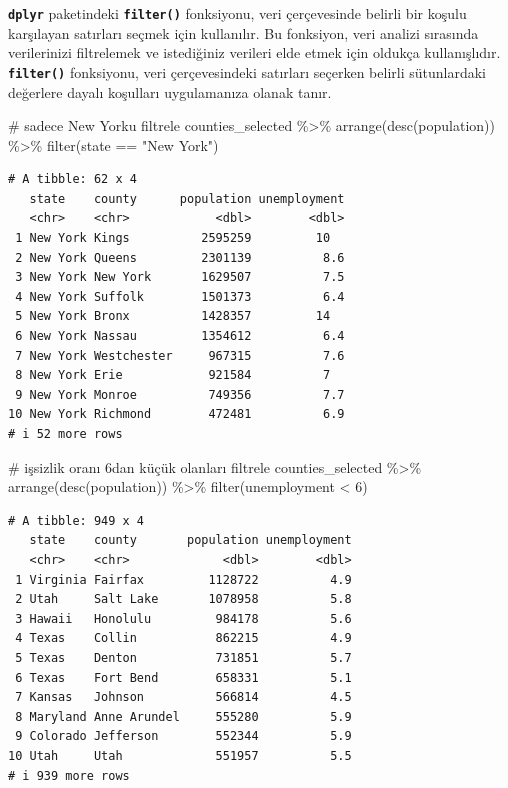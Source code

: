 \documentclass[
  letterpaper,
  DIV=11,
  numbers=noendperiod]{scrreprt}
\newenvironment{Shaded}{\begin{snugshade}}{\end{snugshade}}
\newcommand{\CommentTok}[1]{\textcolor[rgb]{0.37,0.37,0.37}{#1}}
\newcommand{\DecValTok}[1]{\textcolor[rgb]{0.68,0.00,0.00}{#1}}
\newcommand{\FunctionTok}[1]{\textcolor[rgb]{0.28,0.35,0.67}{#1}}
\newcommand{\NormalTok}[1]{\textcolor[rgb]{0.00,0.23,0.31}{#1}}
\newcommand{\SpecialCharTok}[1]{\textcolor[rgb]{0.37,0.37,0.37}{#1}}
\newcommand{\StringTok}[1]{\textcolor[rgb]{0.13,0.47,0.30}{#1}}
\begin{document}

\textbf{\texttt{dplyr}} paketindeki \textbf{\texttt{filter()}}
fonksiyonu, veri çerçevesinde belirli bir koşulu karşılayan satırları
seçmek için kullanılır. Bu fonksiyon, veri analizi sırasında
verilerinizi filtrelemek ve istediğiniz verileri elde etmek için oldukça
kullanışlıdır. \textbf{\texttt{filter()}} fonksiyonu, veri
çerçevesindeki satırları seçerken belirli sütunlardaki değerlere dayalı
koşulları uygulamanıza olanak tanır.

\begin{Shaded}
\begin{Highlighting}[]
\CommentTok{\# sadece New York\textquotesingle{}u filtrele}
\NormalTok{counties\_selected }\SpecialCharTok{\%\textgreater{}\%}
\FunctionTok{arrange}\NormalTok{(}\FunctionTok{desc}\NormalTok{(population)) }\SpecialCharTok{\%\textgreater{}\%}
\FunctionTok{filter}\NormalTok{(state }\SpecialCharTok{==} \StringTok{"New York"}\NormalTok{)}
\end{Highlighting}
\end{Shaded}

\begin{verbatim}
# A tibble: 62 x 4
   state    county      population unemployment
   <chr>    <chr>            <dbl>        <dbl>
 1 New York Kings          2595259         10  
 2 New York Queens         2301139          8.6
 3 New York New York       1629507          7.5
 4 New York Suffolk        1501373          6.4
 5 New York Bronx          1428357         14  
 6 New York Nassau         1354612          6.4
 7 New York Westchester     967315          7.6
 8 New York Erie            921584          7  
 9 New York Monroe          749356          7.7
10 New York Richmond        472481          6.9
# i 52 more rows
\end{verbatim}

\begin{Shaded}
\begin{Highlighting}[]
\CommentTok{\# işsizlik oranı 6\textquotesingle{}dan küçük olanları filtrele}
\NormalTok{counties\_selected }\SpecialCharTok{\%\textgreater{}\%}
\FunctionTok{arrange}\NormalTok{(}\FunctionTok{desc}\NormalTok{(population)) }\SpecialCharTok{\%\textgreater{}\%}
\FunctionTok{filter}\NormalTok{(unemployment }\SpecialCharTok{\textless{}} \DecValTok{6}\NormalTok{)}
\end{Highlighting}
\end{Shaded}

\begin{verbatim}
# A tibble: 949 x 4
   state    county       population unemployment
   <chr>    <chr>             <dbl>        <dbl>
 1 Virginia Fairfax         1128722          4.9
 2 Utah     Salt Lake       1078958          5.8
 3 Hawaii   Honolulu         984178          5.6
 4 Texas    Collin           862215          4.9
 5 Texas    Denton           731851          5.7
 6 Texas    Fort Bend        658331          5.1
 7 Kansas   Johnson          566814          4.5
 8 Maryland Anne Arundel     555280          5.9
 9 Colorado Jefferson        552344          5.9
10 Utah     Utah             551957          5.5
# i 939 more rows
\end{verbatim}
\end{document}
